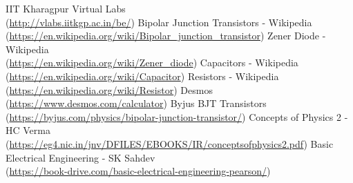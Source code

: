 \begin{thebibliography}{widestlabel}
	 IIT Kharagpur Virtual Labs \\
	(\url{http://vlabs.iitkgp.ac.in/be/})
	 Bipolar Junction Transistors - Wikipedia \\
	(\url{https://en.wikipedia.org/wiki/Bipolar_junction_transistor})
	 Zener Diode - Wikipedia \\
	(\url{https://en.wikipedia.org/wiki/Zener_diode})
	 Capacitors - Wikipedia \\
	(\url{https://en.wikipedia.org/wiki/Capacitor})
	 Resistors - Wikipedia \\
	(\url{https://en.wikipedia.org/wiki/Resistor})
	 Desmos \\
	(\url{https://www.desmos.com/calculator})	
	 Byjus BJT Transistors\\
	(\url{https://byjus.com/physics/bipolar-junction-transistor/})
	 Concepts of Physics 2 - HC Verma\\
	(\url{https://eg4.nic.in/jnv/DFILES/EBOOKS/IR/conceptsofphysics2.pdf})
	 Basic Electrical Engineering - SK Sahdev\\
	(\url{https://book-drive.com/basic-electrical-engineering-pearson/})
\end{thebibliography}